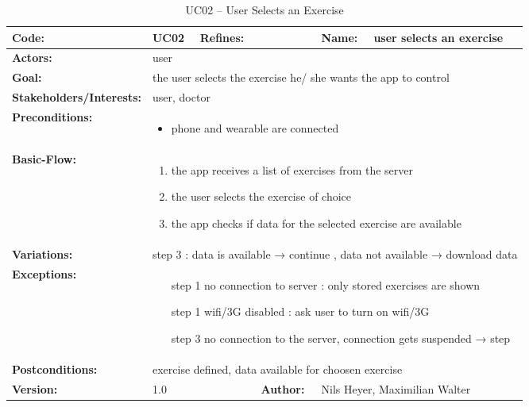 \begin{table}[H]
	\begin{tabular}{|l|l|l|l|l|l|} \hline
		\textbf{Code:} & UC02 & \textbf{Refines:} &  & \textbf{Name:} & user selects an exercise \\ \hline
		\textbf{Actors:} & \multicolumn{5}{l|}{user} \\ \hline
		\textbf{Goal:} & \multicolumn{5}{l|}{the user selects the exercise he/ she wants the app to control} \\ \hline
		\textbf{Stakeholders/Interests:} & \multicolumn{5}{l|}{user, doctor} \\ \hline
		\textbf{Preconditions:} & \multicolumn{5}{l|}{\parbox{0.75\textwidth}{
			\begin{itemize}[itemsep=-5]
				\item phone and wearable are connected
			\end{itemize}
		}} \\ \hline
		\textbf{Basic-Flow:} & \multicolumn{5}{l|}{\parbox{0.75\textwidth}{
			\begin{enumerate}[itemsep=-5]
				\item the app receives a list of exercises from the server
				\item the user selects the exercise of choice
				\item the app checks if data for the selected exercise are available
			\end{enumerate}
		}} \\ \hline
		\textbf{Variations:} & \multicolumn{5}{l|}{
			step 3 : data is available → continue , data not available → download data
		} \\ \hline
		\textbf{Exceptions:} & \multicolumn{5}{l|}{\parbox{0.75\textwidth}{
			\begin{itemize}[leftmargin=1.55cm,itemsep=-5]
				\item[step 1] no connection to server :  only stored exercises are shown
				\item[step 1] wifi/3G disabled  : ask user to turn on wifi/3G
				\item[step 3] no connection to the server, connection gets suspended → step
			\end{itemize}
		}} \\ \hline
		\textbf{Postconditions:} & \multicolumn{5}{l|}{exercise defined, data available for choosen exercise} \\ \hline
		\textbf{Version:} & \multicolumn{2}{l|}{1.0} & \textbf{Author:} & \multicolumn{2}{l|}{Nils Heyer, Maximilian Walter} \\ \hline
	\end{tabular}
	\caption{UC02 -- User Selects an Exercise}
\end{table}

